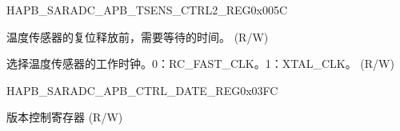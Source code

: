 \begin{register}{H}{APB\_SARADC\_APB\_TSENS\_CTRL2\_REG}{0x005C}\label{regdesc:APBSARADCTSENSCTRL2REG}
%
%
%
%
%
\regnewline%
\begin{regdesc}\begin{reglist}
\label{fielddesc:APBSARADCTSENSXPDWAIT}\item [APB\_SARADC\_TSENS\_XPD\_WAIT] 温度传感器的复位释放前，需要等待的时间。 (R/W)
\label{fielddesc:APBSARADCTSENSCLKSEL}\item [APB\_SARADC\_TSENS\_CLK\_SEL] 选择温度传感器的工作时钟。0：RC\_FAST\_CLK。1：XTAL\_CLK。 (R/W)
\end{reglist}\end{regdesc}
\end{register}



\begin{register}{H}{APB\_SARADC\_APB\_CTRL\_DATE\_REG}{0x03FC}\label{regdesc:APBSARADCCTRLDATEREG}
%
\regnewline%
\begin{regdesc}\begin{reglist}
\label{fielddesc:APBSARADCDATE}\item [APB\_SARADC\_DATE] 版本控制寄存器 (R/W)
\end{reglist}\end{regdesc}
\end{register}


